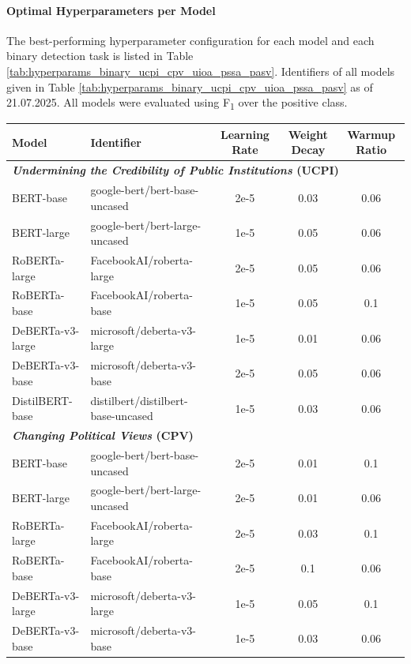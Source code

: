 \documentclass[11pt]{article}
\begin{document}
\paragraph{Optimal Hyperparameters per Model}

The best-performing hyperparameter configuration for each model and each binary detection task is listed in Table \ref{tab:hyperparams_binary_ucpi_cpv_uioa_pssa_pasv}. Identifiers of all models given in Table \ref{tab:hyperparams_binary_ucpi_cpv_uioa_pssa_pasv} as of 21.07.2025. All models were evaluated using F\textsubscript{1} over the positive class.

 \begin{table}[ht]
\centering
\small
\begin{tabular}{llccc}
\toprule
\textbf{Model} & \textbf{Identifier} & \textbf{Learning Rate} & \textbf{Weight Decay} & \textbf{Warmup Ratio} \\
\midrule
\multicolumn{5}{l}{\textbf{\textit{Undermining the Credibility of Public Institutions} (UCPI)}} \\
\midrule
BERT-base & google-bert/bert-base-uncased & 2e-5 & 0.03 & 0.06 \\
BERT-large & google-bert/bert-large-uncased & 1e-5 & 0.05 & 0.06 \\
RoBERTa-large & FacebookAI/roberta-large & 2e-5 & 0.05 & 0.06 \\
RoBERTa-base & FacebookAI/roberta-base & 1e-5 & 0.05 & 0.1 \\
DeBERTa-v3-large & microsoft/deberta-v3-large & 1e-5 & 0.01 & 0.06 \\
DeBERTa-v3-base & microsoft/deberta-v3-base & 2e-5 & 0.05 & 0.06 \\
DistilBERT-base & distilbert/distilbert-base-uncased & 1e-5 & 0.03 & 0.06 \\
\midrule
\multicolumn{5}{l}{\textbf{\textit{Changing Political Views} (CPV)}} \\
\midrule
BERT-base & google-bert/bert-base-uncased & 2e-5 & 0.01 & 0.1 \\
BERT-large & google-bert/bert-large-uncased & 2e-5 & 0.01 & 0.06 \\
RoBERTa-large & FacebookAI/roberta-large & 2e-5 & 0.03 & 0.1 \\
RoBERTa-base & FacebookAI/roberta-base & 2e-5 & 0.1 & 0.06 \\
DeBERTa-v3-large & microsoft/deberta-v3-large & 1e-5 & 0.05 & 0.1 \\
DeBERTa-v3-base & microsoft/deberta-v3-base & 1e-5 & 0.03 & 0.06 \\

\end{tabular}
\end{table}
\end{document}
